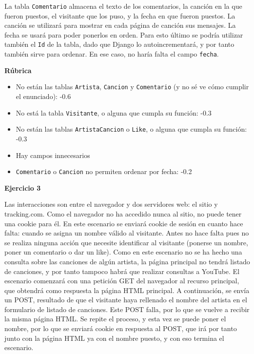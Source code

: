 La tabla \texttt{Comentario} almacena el texto de los comentarios, la canción en la que fueron puestos, el visitante que los puso,  y la fecha en que fueron puestos. La canción se utilizará para mostrar en cada página de canción sus mensajes. La fecha se usará para poder ponerlos en orden. Para esto último se podría utilizar también el \texttt{Id} de la tabla, dado que Django lo autoincrementará, y por tanto también sirve para ordenar. En ese caso, no haría falta el campo \texttt{fecha}.

\vspace{.4cm}\textbf{Rúbrica}

\begin{itemize}
\item No están las tablas \texttt{Artista}, \texttt{Cancion} y \texttt{Comentario} (y no sé ve cómo cumplir el enunciado): -0.6
\item No está la tabla \texttt{Visitante}, o alguna que cumpla su función: -0.3
\item No están las tablas \texttt{ArtistaCancion} o \texttt{Like}, o alguna que cumpla su función: -0.3
\item Hay campos innecesarios
\item \texttt{Comentario} o \texttt{Cancion} no permiten ordenar por fecha: -0.2
\end{itemize}

\textbf{Ejercicio 3}

Las interacciones son entre el navegador y dos servidores web: el sitio y tracking.com. Como el navegador no ha accedido nunca al sitio, no puede tener una cookie para él. En este escenario se enviará cookie de sesión en cuanto hace falta: cuando se asigna un nombre válido al visitante. Antes no hace falta pues no se realiza ninguna acción que necesite identificar al visitante (ponerse un nombre, poner un comentario o dar un like). Como en este escenario no se ha hecho una consulta sobre las canciones de algún artista, la página principal no tendrá listado de canciones, y por tanto tampoco habrá que realizar consultas a YouTube. El escenario comenzará con una petición GET del navegador al recurso principal, que obtendrá como respuesta la página HTML principal. A continuación, se envía un POST, resultado de que el visitante haya rellenado el nombre del artista en el formulario de listado de canciones. Este POST falla, por lo que se vuelve a recibir la misma página HTML. Se repite el proceso, y esta vez se puede poner el nombre, por lo que se enviará cookie en respuesta al POST, que irá por tanto junto con la página HTML ya con el nombre puesto, y con eso termina el escenario.

